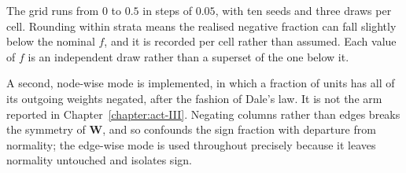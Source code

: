 The grid runs from
$0$ to $0.5$ in steps of $0.05$, %
with
ten seeds and three draws %
per cell. Rounding within strata means the realised negative fraction can fall
slightly below the nominal $f$, and it is recorded per cell rather than assumed.
Each value of $f$ is an independent draw rather than a superset of the one
below it.

A second, node-wise mode is implemented, in which a fraction of units has all of
its outgoing weights negated, after the fashion of Dale's law. It is not the
arm reported in Chapter~\ref{chapter:act-III}. Negating columns rather than
edges breaks the symmetry of $\mathbf{W}$, and so confounds the sign fraction
with departure from normality; the edge-wise mode is used throughout precisely
because it leaves normality untouched and isolates sign.













